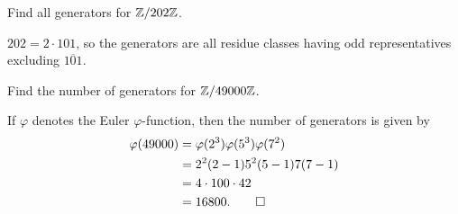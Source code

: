  Find all generators for $\mathbb{Z}/202\mathbb{Z}$.
\begin{solution}
  $202 = 2\cdot101$, so the generators are all residue classes having
  odd representatives excluding $\overline{101}$.
\end{solution}

 Find the number of generators for $\mathbb{Z}/49000\mathbb{Z}$.
\begin{solution}
  If $\varphi$ denotes the Euler $\varphi$-function, then the number
  of generators is given by
  \begin{align*}
    \varphi(49000)
    &= \varphi(2^3)\varphi(5^3)\varphi(7^2) \\
    &= 2^2(2 - 1)5^2(5 - 1)7(7 - 1) \\
    &= 4\cdot100\cdot42 \\
    &= 16800. \qedhere
  \end{align*}
\end{solution}

